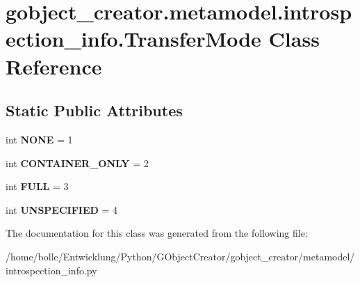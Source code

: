\hypertarget{classgobject__creator_1_1metamodel_1_1introspection__info_1_1TransferMode}{
\section{gobject\_\-creator.metamodel.introspection\_\-info.TransferMode Class Reference}
\label{classgobject__creator_1_1metamodel_1_1introspection__info_1_1TransferMode}
}
\subsection*{Static Public Attributes}
\begin{DoxyCompactItemize}
\item 
\hypertarget{classgobject__creator_1_1metamodel_1_1introspection__info_1_1TransferMode_aa034735e17f6d6dce45d83f60e4f60ba}{
int {\bfseries NONE} = 1}
\label{classgobject__creator_1_1metamodel_1_1introspection__info_1_1TransferMode_aa034735e17f6d6dce45d83f60e4f60ba}

\item 
\hypertarget{classgobject__creator_1_1metamodel_1_1introspection__info_1_1TransferMode_a9df6e88b0423cd6e8b98a4de2cfd2f11}{
int {\bfseries CONTAINER\_\-ONLY} = 2}
\label{classgobject__creator_1_1metamodel_1_1introspection__info_1_1TransferMode_a9df6e88b0423cd6e8b98a4de2cfd2f11}

\item 
\hypertarget{classgobject__creator_1_1metamodel_1_1introspection__info_1_1TransferMode_ac49123d7d453e080306ad7b4cd647b29}{
int {\bfseries FULL} = 3}
\label{classgobject__creator_1_1metamodel_1_1introspection__info_1_1TransferMode_ac49123d7d453e080306ad7b4cd647b29}

\item 
\hypertarget{classgobject__creator_1_1metamodel_1_1introspection__info_1_1TransferMode_a9462abb2ef4b01d147d46feae7a9de43}{
int {\bfseries UNSPECIFIED} = 4}
\label{classgobject__creator_1_1metamodel_1_1introspection__info_1_1TransferMode_a9462abb2ef4b01d147d46feae7a9de43}

\end{DoxyCompactItemize}


The documentation for this class was generated from the following file:\begin{DoxyCompactItemize}
\item 
/home/bolle/Entwicklung/Python/GObjectCreator/gobject\_\-creator/metamodel/introspection\_\-info.py\end{DoxyCompactItemize}
